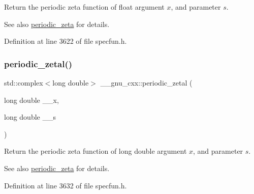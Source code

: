 Return the periodic zeta function of {\ttfamily float} argument $ x $, and parameter $ s $.

\begin{DoxySeeAlso}{See also}
\hyperlink{group__gnu__math__spec__func_ga06b06216e87b868cb21c76d33ac560c8}{periodic\+\_\+zeta} for details. 
\end{DoxySeeAlso}


Definition at line 3622 of file specfun.\+h.

\mbox{\label{group__gnu__math__spec__func_gab7573fb57ebaabac4432bb5e6b525151}} 
\subsubsection{\texorpdfstring{periodic\+\_\+zetal()}{periodic\_zetal()}}
{\footnotesize\ttfamily std\+::complex$<$long double$>$ \+\_\+\+\_\+gnu\+\_\+cxx\+::periodic\+\_\+zetal (\begin{DoxyParamCaption}\item[{long double}]{\+\_\+\+\_\+x,  }\item[{long double}]{\+\_\+\+\_\+s }\end{DoxyParamCaption})\hspace{0.3cm}{\ttfamily [inline]}}

Return the periodic zeta function of {\ttfamily long double} argument $ x $, and parameter $ s $.

\begin{DoxySeeAlso}{See also}
\hyperlink{group__gnu__math__spec__func_ga06b06216e87b868cb21c76d33ac560c8}{periodic\+\_\+zeta} for details. 
\end{DoxySeeAlso}


Definition at line 3632 of file specfun.\+h.

\mbox{\label{group__gnu__math__spec__func_ga65e674e7fe1457e819897e0d608c18b8}} 
